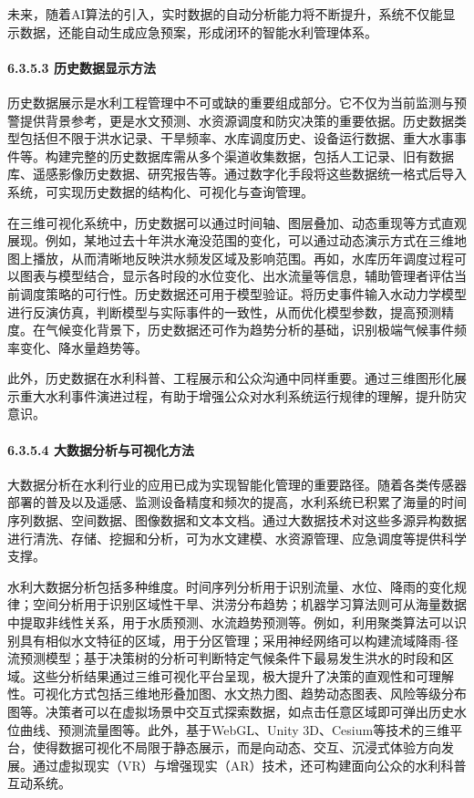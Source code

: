未来，随着AI算法的引入，实时数据的自动分析能力将不断提升，系统不仅能显示数据，还能自动生成应急预案，形成闭环的智能水利管理体系。

\paragraph{6.3.5.3 历史数据显示方法}\label{ux5386ux53f2ux6570ux636eux663eux793aux65b9ux6cd5}

历史数据展示是水利工程管理中不可或缺的重要组成部分。它不仅为当前监测与预警提供背景参考，更是水文预测、水资源调度和防灾决策的重要依据。历史数据类型包括但不限于洪水记录、干旱频率、水库调度历史、设备运行数据、重大水事事件等。构建完整的历史数据库需从多个渠道收集数据，包括人工记录、旧有数据库、遥感影像历史数据、研究报告等。通过数字化手段将这些数据统一格式后导入系统，可实现历史数据的结构化、可视化与查询管理。

在三维可视化系统中，历史数据可以通过时间轴、图层叠加、动态重现等方式直观展现。例如，某地过去十年洪水淹没范围的变化，可以通过动态演示方式在三维地图上播放，从而清晰地反映洪水频发区域及影响范围。再如，水库历年调度过程可以图表与模型结合，显示各时段的水位变化、出水流量等信息，辅助管理者评估当前调度策略的可行性。历史数据还可用于模型验证。将历史事件输入水动力学模型进行反演仿真，判断模型与实际事件的一致性，从而优化模型参数，提高预测精度。在气候变化背景下，历史数据还可作为趋势分析的基础，识别极端气候事件频率变化、降水量趋势等。

此外，历史数据在水利科普、工程展示和公众沟通中同样重要。通过三维图形化展示重大水利事件演进过程，有助于增强公众对水利系统运行规律的理解，提升防灾意识。

\paragraph{6.3.5.4 大数据分析与可视化方法}\label{ux5927ux6570ux636eux5206ux6790ux4e0eux53efux89c6ux5316ux65b9ux6cd5}

大数据分析在水利行业的应用已成为实现智能化管理的重要路径。随着各类传感器部署的普及以及遥感、监测设备精度和频次的提高，水利系统已积累了海量的时间序列数据、空间数据、图像数据和文本文档。通过大数据技术对这些多源异构数据进行清洗、存储、挖掘和分析，可为水文建模、水资源管理、应急调度等提供科学支撑。

水利大数据分析包括多种维度。时间序列分析用于识别流量、水位、降雨的变化规律；空间分析用于识别区域性干旱、洪涝分布趋势；机器学习算法则可从海量数据中提取非线性关系，用于水质预测、水流趋势预测等。例如，利用聚类算法可以识别具有相似水文特征的区域，用于分区管理；采用神经网络可以构建流域降雨-径流预测模型；基于决策树的分析可判断特定气候条件下最易发生洪水的时段和区域。这些分析结果通过三维可视化平台呈现，极大提升了决策的直观性和可理解性。可视化方式包括三维地形叠加图、水文热力图、趋势动态图表、风险等级分布图等。决策者可以在虚拟场景中交互式探索数据，如点击任意区域即可弹出历史水位曲线、预测流量图等。此外，基于WebGL、Unity 3D、Cesium等技术的三维平台，使得数据可视化不局限于静态展示，而是向动态、交互、沉浸式体验方向发展。通过虚拟现实（VR）与增强现实（AR）技术，还可构建面向公众的水利科普互动系统。

